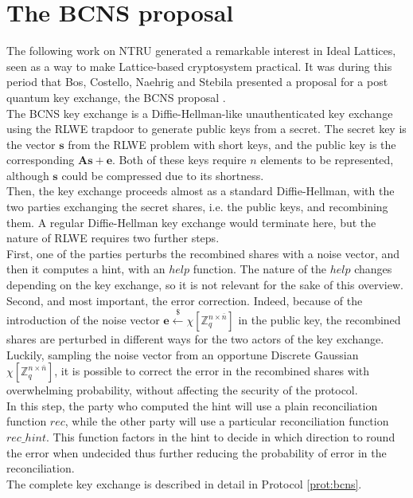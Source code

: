 \section{The BCNS proposal}
The following work on NTRU generated a remarkable interest in Ideal Lattices, seen as a way to make Lattice-based cryptosystem practical. It was during this period that Bos, Costello, Naehrig and Stebila presented a proposal for a post quantum key exchange, the BCNS proposal \cite{BCNS}.\\
The BCNS key exchange is a Diffie-Hellman-like unauthenticated key exchange using the RLWE trapdoor to generate public keys from a secret. The secret key is the vector $\mathbf{s}$ from the RLWE problem with short keys, and the public key is the corresponding $\mathbf{A}\mathbf{s}+\mathbf{e}$. Both of these keys require $n$ elements to be represented, although $\mathbf{s}$ could be compressed due to its shortness.\\
Then, the key exchange proceeds almost as a standard Diffie-Hellman, with the two parties exchanging the secret shares, i.e. the public keys, and recombining them. A regular Diffie-Hellman key exchange would terminate here, but the nature of RLWE requires two further steps.\\
First, one of the parties perturbs the recombined shares with a noise vector, and then it computes a hint, with an $help$ function. The nature of the $help$ changes depending on the key exchange, so it is not relevant for the sake of this overview. Second, and most important, the error correction. Indeed, because of the introduction of the noise vector $\mathbf{e}\xleftarrow{\$}\chi[\mathbb{Z}^{n\times\bar{n}}_q]$ in the public key, the recombined shares are perturbed in different ways for the two actors of the key exchange. Luckily, sampling the noise vector from an opportune Discrete Gaussian $\chi[\mathbb{Z}^{n\times\bar{n}}_q]$, it is possible to correct the error in the recombined shares with overwhelming probability, without affecting the security of the protocol.\\
In this step, the party who computed the hint will use a plain reconciliation function $rec$, while the other party will use a particular reconciliation function $rec\_hint$. This function factors in the hint to decide in which direction to round the error when undecided thus further reducing the probability of error in the reconciliation. \\
The complete key exchange is described in detail in Protocol \ref{prot:bcns}.\\
